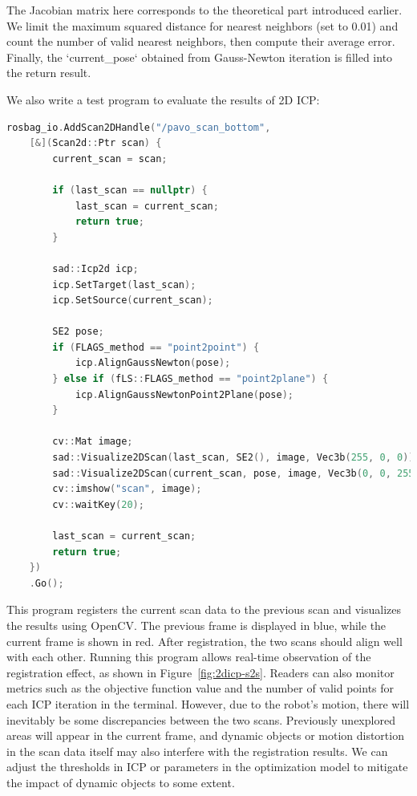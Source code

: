 The Jacobian matrix here corresponds to the theoretical part introduced earlier. We limit the maximum squared distance for nearest neighbors (set to 0.01) and count the number of valid nearest neighbors, then compute their average error. Finally, the `current_pose` obtained from Gauss-Newton iteration is filled into the return result.

We also write a test program to evaluate the results of 2D ICP:

\begin{lstlisting}[language=c++,caption=src/ch6/test\_2d\_icp\_s2s.cc]
	rosbag_io.AddScan2DHandle("/pavo_scan_bottom",
	[&](Scan2d::Ptr scan) {
		current_scan = scan;
		
		if (last_scan == nullptr) {
			last_scan = current_scan;
			return true;
		}
		
		sad::Icp2d icp;
		icp.SetTarget(last_scan);
		icp.SetSource(current_scan);
		
		SE2 pose;
		if (FLAGS_method == "point2point") {
			icp.AlignGaussNewton(pose);
		} else if (fLS::FLAGS_method == "point2plane") {
			icp.AlignGaussNewtonPoint2Plane(pose);
		}
		
		cv::Mat image;
		sad::Visualize2DScan(last_scan, SE2(), image, Vec3b(255, 0, 0));    // target in blue
		sad::Visualize2DScan(current_scan, pose, image, Vec3b(0, 0, 255));  // source in red
		cv::imshow("scan", image);
		cv::waitKey(20);
		
		last_scan = current_scan;
		return true;
	})
	.Go();
\end{lstlisting}

This program registers the current scan data to the previous scan and visualizes the results using OpenCV. The previous frame is displayed in blue, while the current frame is shown in red. After registration, the two scans should align well with each other. Running this program allows real-time observation of the registration effect, as shown in Figure~\ref{fig:2dicp-s2s}. Readers can also monitor metrics such as the objective function value and the number of valid points for each ICP iteration in the terminal. However, due to the robot's motion, there will inevitably be some discrepancies between the two scans. Previously unexplored areas will appear in the current frame, and dynamic objects or motion distortion in the scan data itself may also interfere with the registration results. We can adjust the thresholds in ICP or parameters in the optimization model to mitigate the impact of dynamic objects to some extent.

